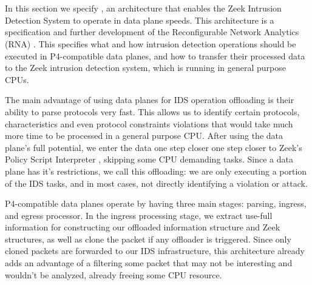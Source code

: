 \section{\TheArchitecture{}} 
\label{sec:architecture}



In this section we specify \TheArchitecture{}, an architecture that enables the Zeek Intrusion Detection System to operate in data plane speeds. This architecture is a specification and further development of the Reconfigurable Network Analytics (RNA) \cite{RNA2022}. This specifies what and how intrusion detection operations should be executed in P4-compatible data planes, and how to transfer their processed data to the Zeek intrusion detection system, which is running in general purpose CPUs.

The main advantage of using data planes for IDS operation offloading is their ability to parse protocols very fast. This allows us to identify certain protocols, characteristics and even protocol constraints violations that would take much more time to be processed in a general purpose CPU. After using the data plane's full potential, we enter the data one step closer one step closer to Zeek's Policy Script Interpreter , skipping some CPU demanding tasks. Since a data plane has it's restrictions, we call this offloading: we are only executing a portion of the IDS tasks, and in most cases, not directly identifying a violation or attack.

P4-compatible data planes operate by having three main stages: parsing, ingress, and egress processor. In the ingress processing stage, we extract use-full information for constructing our offloaded information structure and Zeek structures, as well as clone the packet if any offloader is triggered. Since only cloned packets are forwarded to our IDS infrastructure, this architecture already adds an advantage of a filtering some packet that may not be interesting and wouldn't be analyzed, already freeing some CPU resource.



